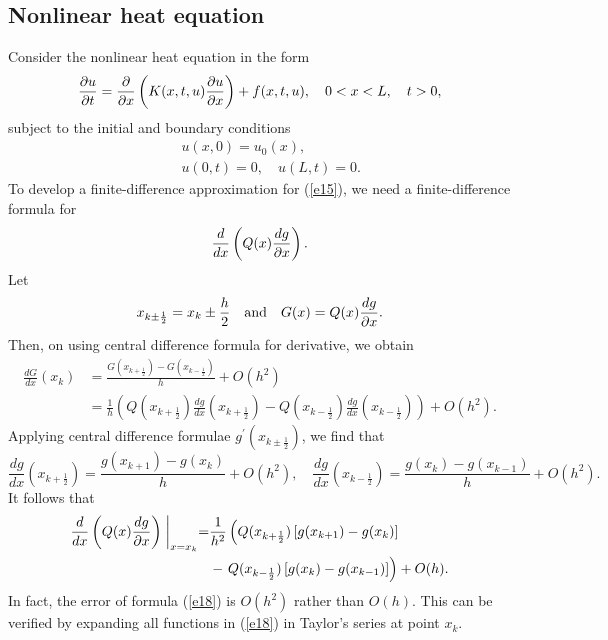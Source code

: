 %
%
%


\subsection{Nonlinear heat equation}

Consider the nonlinear heat equation in the form
\begin{equation}
\frac{{\partial} u}{{\partial} t} =\frac{{\partial} }{{\partial} x}\left(K(x,t,u)
\frac{{\partial} u}{{\partial} x}\right)+f(x,t,u),  \quad 0<x< L, \quad t>0, \label{e15}
\end{equation}
subject to the initial and boundary conditions
\begin{eqnarray}
&&u(x, 0) = u_{0}(x), \label{e16} \\
&&u(0,t)=0, \quad u(L,t)=0.   \label{e17}
\end{eqnarray}
To develop a finite-difference approximation for (\ref{e15}), we need
a finite-difference formula for
\[
\frac{d }{d x}\left(Q(x)
\frac{d g}{{\partial} x}\right).
\]
Let
\[
x_{k\pm\frac{1}{2}}=x_{k}\pm \frac{h}{2} \quad {\rm and} \quad
G(x)=Q(x)\frac{d g}{{\partial} x}.
\]
Then, on using central difference formula for derivative, we obtain
\[\begin{split}
\frac{dG}{dx}(x_{k})&=\frac{G(x_{k+\frac{1}{2}})-G(x_{k-\frac{1}{2}})}{h}+O(h^2)\\&=
\frac{1}{h}\left(
Q(x_{k+\frac{1}{2}})\frac{dg}{dx}(x_{k+\frac{1}{2}})
-Q(x_{k-\frac{1}{2}})\frac{dg}{dx}(x_{k-\frac{1}{2}})\right)+O(h^2).
\end{split}\]
Applying central difference formulae $g^{\prime}(x_{k\pm\frac{1}{2}})$, we find that
\[
\frac{dg}{dx}(x_{k+\frac{1}{2}})=\frac{g(x_{k+1})-g(x_{k})}{h}+O(h^2), \quad
\frac{dg}{dx}(x_{k-\frac{1}{2}})=\frac{g(x_{k})-g(x_{k-1})}{h}+O(h^2).
\]
It follows that
\begin{equation}\begin{split}
\frac{d }{d x}\left(Q(x)
\frac{d g}{{\partial} x}\right)\biggm\vert_{x=x_{k}}=&\frac{1}{h^2}
\left(Q(x_{k+\frac{1}{2}})\left[g(x_{k+1})-g(x_{k})\right]\right.\\&-
\left.Q(x_{k-\frac{1}{2}})\left[g(x_{k})-g(x_{k-1})\right]\right) +O(h).\label{e18}
\end{split}\end{equation}
In fact, the error of formula (\ref{e18}) is $O(h^2)$ rather than $O(h)$. This can be verified
by expanding all functions in (\ref{e18}) in Taylor's series at point $x_{k}$.

